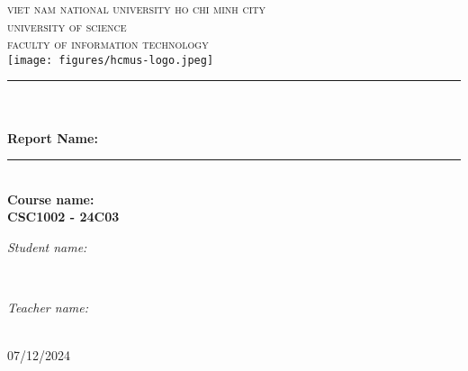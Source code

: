 \begin{titlepage}
    \newcommand{\HRule}{\rule{\linewidth}{0.5mm}}
    \centering
    
    \textsc{\LARGE viet nam national university ho chi minh city}\\ [0.5cm]
    \textsc{\large university of science} \\ [0.5cm]
    \textsc{\large faculty of information technology} \\ [0.5cm]
    
    \texttt{[image: figures/hcmus-logo.jpeg]} \\ [0cm]
    \HRule \\ [0.2cm]
    {
    \huge{\bfseries{\reporttitle}}\\[0.2cm]
    \Large{\bfseries{Report Name: \reportname}}
    }
    \\[0.2cm]
    \HRule \\ [0.2cm]
    
    \textbf{\large Course name: \coursename}\\ [0.3cm]
    \textbf{\large CSC1002 - 24C03} \\ [1.3cm]
    
    \begin{minipage}[t]{0.4\textwidth}
    \begin{flushleft} \large
    \emph{Student name: }\\
    \studentname
    \end{flushleft}
    \end{minipage}
    ~
    \begin{minipage}[t]{0.4\textwidth}
    \begin{flushright} \Large
    \emph{Teacher name: } \\
    \teachername
    \end{flushright}
    \end{minipage} \\[4.2cm]
    {\large 07/12/2024} \\[0.4cm]
    \vfill
    
\end{titlepage}

